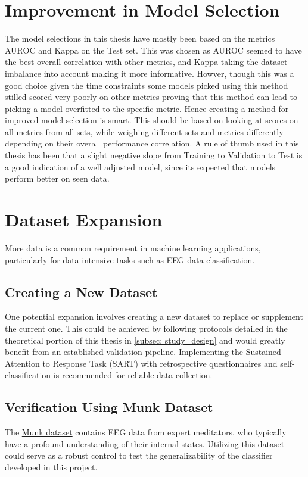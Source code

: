 \section{Improvement in Model Selection}
The model selections in this thesis have mostly been based on the metrics AUROC and Kappa on the Test set. This was chosen as AUROC seemed to have the best overall correlation with other metrics, and  Kappa taking the dataset imbalance into account making it more informative. Howver, though this was a good choice given the time constraints some models picked using this method stilled scored very poorly on other metrics proving that this method can lead to picking a model overfitted to the specific metric. Hence creating a method for improved model selection is smart. This should be based on looking at scores on all metrics from all sets, while weighing different sets and metrics differently depending on their overall performance correlation. A rule of thumb used in this thesis has been that a slight negative slope from Training to Validation to Test is a good indication of a well adjusted model, since its expected that models perform better on seen data.

\section{Dataset Expansion}
More data is a common requirement in machine learning applications, particularly for data-intensive tasks such as EEG data classification.

\subsection{Creating a New Dataset}
One potential expansion involves creating a new dataset to replace or supplement the current one. This could be achieved by following protocols detailed in the theoretical portion of this thesis in \autoref{subsec: study_design} and would greatly benefit from an established validation pipeline. Implementing the Sustained Attention to Response Task (SART) with retrospective questionnaires and self-classification is recommended for reliable data collection.

\subsection{Verification Using Munk Dataset}
The \href{https://openneuro.org/datasets/ds001787/versions/1.0.3}{Munk dataset} contains EEG data from expert meditators, who typically have a profound understanding of their internal states. Utilizing this dataset could serve as a robust control to test the generalizability of the classifier developed in this project.

